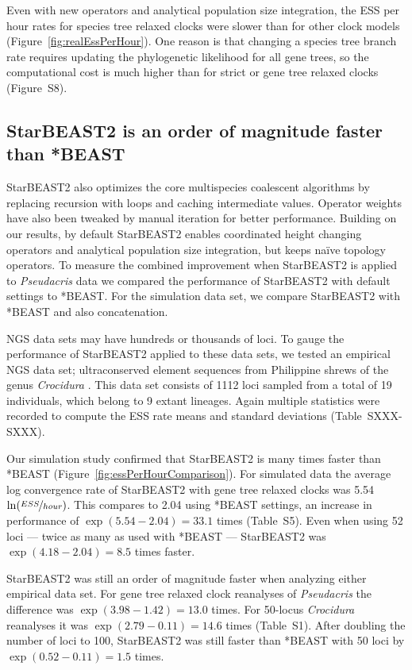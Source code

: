 \documentclass[nogrid]{MBE}%
\begin{document}
Even with new operators and analytical population size integration, the ESS
per hour rates for species tree relaxed clocks were slower than for other
clock models (Figure~\ref{fig:realEssPerHour}). One reason is that changing a
species tree branch rate requires updating the phylogenetic likelihood for all
gene trees, so the computational cost is much higher than for strict or gene
tree relaxed clocks (Figure~S8).

\subsection{StarBEAST2 is an order of magnitude faster than *BEAST}

StarBEAST2 also optimizes the core multispecies coalescent algorithms by
replacing recursion with loops and caching intermediate values. Operator
weights have also been tweaked by manual iteration for better performance.
Building on our results, by default StarBEAST2 enables coordinated height
changing operators and analytical population size integration, but keeps
na\"ive topology operators. To measure the combined improvement when
StarBEAST2 is applied to \textit{Pseudacris} data we compared the performance
of StarBEAST2 with default settings to *BEAST. For the simulation data set, we
compare StarBEAST2 with *BEAST and also concatenation.

NGS data sets may have hundreds or thousands of loci. To gauge the performance
of StarBEAST2 applied to these data sets, we tested an empirical NGS data set;
ultraconserved element \citep[UCE;][]{Faircloth01102012} sequences from
Philippine shrews of the genus \textit{Crocidura} \citep{Giarla01092015}. This
data set consists of 1112 loci sampled from a total of 19 individuals, which
belong to 9 extant lineages. Again multiple statistics were recorded to
compute the ESS rate means and standard deviations (Table~SXXX-SXXX).

Our simulation study confirmed that StarBEAST2 is many times faster than
*BEAST (Figure~\ref{fig:essPerHourComparison}). For simulated data the average
log convergence rate of StarBEAST2 with gene tree relaxed clocks was 5.54
$\ln(\nicefrac{ESS}{hour})$. This compares to 2.04 using *BEAST settings, an
increase in performance of $\exp(5.54 - 2.04) = 33.1$ times (Table~S5). Even
when using 52 loci --- twice as many as used with *BEAST --- StarBEAST2 was
$\exp(4.18 - 2.04) = 8.5$ times faster.

StarBEAST2 was still an order of magnitude faster when analyzing either
empirical data set. For gene tree relaxed clock reanalyses of
\textit{Pseudacris} the difference was $\exp(3.98 - 1.42) = 13.0$ times. For
50-locus \textit{Crocidura} reanalyses it was $\exp(2.79 - 0.11) = 14.6$ times
(Table~S1). After doubling the number of loci to 100, StarBEAST2 was still
faster than *BEAST with 50 loci by $\exp(0.52 - 0.11) = 1.5$ times.
\end{document}
